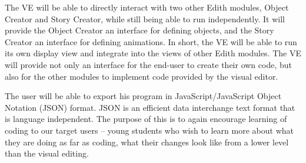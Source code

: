 \documentclass[a4paper, 10pt, oneside]{article}
\begin{document}
\begin{usecase}
{\indent The VE will be able to directly interact with two other Edith modules, Object Creator and Story Creator, while still being able to run independently.  It will provide the Object Creator an interface for defining objects, and the Story Creator an interface for defining animations.  In short, the VE will be able to run its own display view and integrate into the views of other Edith modules. The VE will provide not only an interface for the end-user to create their own code, but also for the other modules to implement code provided by the visual editor.\newline	

\indent The user will be able to export his program in JavaScript/JavaScript Object Notation (JSON) format. JSON is an efficient data interchange text format that is language independent. The purpose of this is to again encourage learning of coding to our target users -- young students who wish to learn more about what they are doing as far as coding, what their changes look like from a lower level than the visual editing.\newline
}

\end{usecase}
\end{document}
